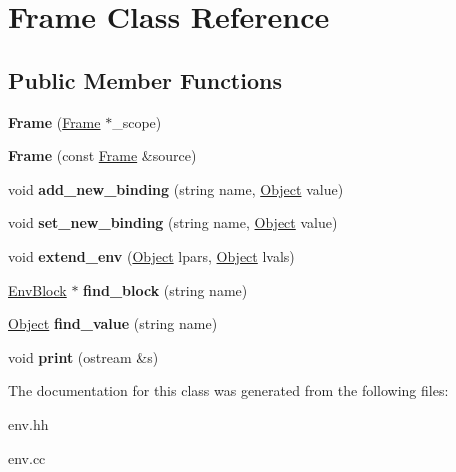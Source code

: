 \hypertarget{classFrame}{\section{Frame Class Reference}
\label{classFrame}
}
\subsection*{Public Member Functions}
\begin{DoxyCompactItemize}
\item 
\hypertarget{classFrame_ad6270328988c4bf73df7f24a0e7cf5f7}{{\bfseries Frame} (\hyperlink{classFrame}{Frame} $\ast$\-\_\-scope)}\label{classFrame_ad6270328988c4bf73df7f24a0e7cf5f7}

\item 
\hypertarget{classFrame_a57eb3325f3ef059d1cab3ddb35e2a4ec}{{\bfseries Frame} (const \hyperlink{classFrame}{Frame} \&source)}\label{classFrame_a57eb3325f3ef059d1cab3ddb35e2a4ec}

\item 
\hypertarget{classFrame_aef63d90c2cd48dec6ac9b6dfd6f7d958}{void {\bfseries add\-\_\-new\-\_\-binding} (string name, \hyperlink{classCell}{Object} value)}\label{classFrame_aef63d90c2cd48dec6ac9b6dfd6f7d958}

\item 
\hypertarget{classFrame_a258655c409c6055a761ac8cc12fb2948}{void {\bfseries set\-\_\-new\-\_\-binding} (string name, \hyperlink{classCell}{Object} value)}\label{classFrame_a258655c409c6055a761ac8cc12fb2948}

\item 
\hypertarget{classFrame_a60853a5572534d23b5cf480c6217b9b8}{void {\bfseries extend\-\_\-env} (\hyperlink{classCell}{Object} lpars, \hyperlink{classCell}{Object} lvals)}\label{classFrame_a60853a5572534d23b5cf480c6217b9b8}

\item 
\hypertarget{classFrame_abe6a8a4589d130373c89147b660de034}{\hyperlink{classEnvBlock}{Env\-Block} $\ast$ {\bfseries find\-\_\-block} (string name)}\label{classFrame_abe6a8a4589d130373c89147b660de034}

\item 
\hypertarget{classFrame_a148a624be2406df10c0655c9d87d0544}{\hyperlink{classCell}{Object} {\bfseries find\-\_\-value} (string name)}\label{classFrame_a148a624be2406df10c0655c9d87d0544}

\item 
\hypertarget{classFrame_a5b0bcbaf2acba4166d94269a9b938834}{void {\bfseries print} (ostream \&s)}\label{classFrame_a5b0bcbaf2acba4166d94269a9b938834}

\end{DoxyCompactItemize}


The documentation for this class was generated from the following files\-:\begin{DoxyCompactItemize}
\item 
env.\-hh\item 
env.\-cc\end{DoxyCompactItemize}
